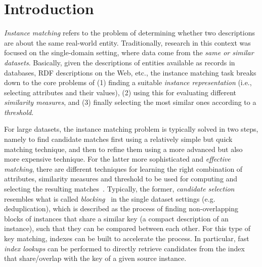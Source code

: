 \section{Introduction}
\emph{Instance matching} \cite{DBLP:journals/ijswis/FerraraNS11} refers to the problem of determining whether two descriptions are about the same real-world entity. Traditionally, research in this context was focused on the single-domain setting, where data come from the \emph{same or similar datasets}. Basically, given the descriptions of entities available as records in databases, RDF descriptions on the Web, etc., the instance matching task breaks down to the core problems of (1) finding a suitable \emph{instance representation} (i.e., selecting attributes and their values), (2) using this for evaluating different \emph{similarity measures}, and (3) finally selecting the most similar ones according to a \emph{threshold}. 

For large datasets, the instance matching problem is typically solved in two steps, namely to find candidate matches first using a relatively simple but quick matching technique, and then to refine them using a more advanced but also more expensive technique. For the latter more sophisticated and \emph{effective matching}, there are different techniques for learning the right combination of attributes, similarity measures and threshold to be used for computing and selecting the resulting matches~\cite{DBLP:conf/cikm/SongH10,MaurouxHJAM09,nikolov08}. Typically, the former, \emph{candidate selection} resembles what is called  \emph{blocking}~\cite{hernandez_merge/purge_1995,MichelsonK06,elmagarmid_duplicate_2007} in the single dataset settings (e.g. deduplication), which is described as the process of finding non-overlapping blocks of instances that share a similar key (a compact description of an instance), such that they can be compared between each other. For this type of key matching, indexes can be built to accelerate the process. In particular, fast \emph{index lookups} can be performed to directly retrieve candidates from the index that share/overlap with the key of a given source instance. 


